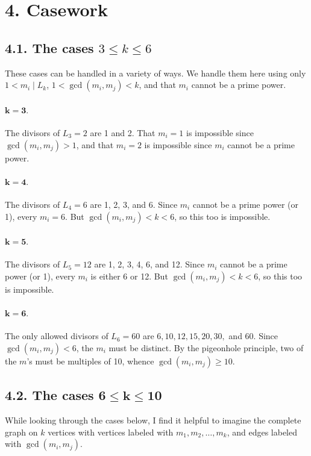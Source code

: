 \documentclass[12pt]{article}
\begin{document}
\vskip 30pt
\section*{\normalsize 4. Casework}

\subsection*{\normalsize 4.1. The cases $3\le k \le 6$}
These cases can be handled in a variety of ways. We handle them here using only \mbox{$1<m_i \mid L_k$},
$1<\gcd(m_i,m_j)<k$, and that $m_i$ cannot be a prime power.

\paragraph{{$\mathbf{k=3}.$}}
The divisors of $L_3=2$ are 1 and 2. That $m_i=1$ is impossible since $\gcd(m_i,m_j)>1$, and that $m_i=2$ is
impossible since $m_i$ cannot be a prime power.

\paragraph{$\mathbf{k=4}.$}
The divisors of $L_4=6$ are 1, 2, 3, and 6. Since $m_i$ cannot be a prime power (or 1), every $m_i=6$. But
$\gcd(m_i,m_j)<k<6$, so this too is impossible.

\paragraph{$\mathbf{k=5}.$}
The divisors of $L_5=12$ are 1, 2, 3, 4, 6, and 12. Since $m_i$ cannot be a prime power (or 1), every $m_i$ is
either $6$ or 12. But $\gcd(m_i,m_j)<k<6$, so this too is impossible.

\paragraph{$\mathbf{k=6}.$}
The only allowed divisors of $L_6=60$ are $6, 10, 12, 15, 20, 30,$ and 60. Since $\gcd(m_i,m_j)<6$, the $m_i$
must be distinct. By the pigeonhole principle, two of the $m$'s must be multiples of 10, whence
$\gcd(m_i,m_j)\ge 10$.


\subsection*{\normalsize 4.2. The cases $\mathbf{6\le k \le 10}$}

While looking through the cases below, I find it helpful to imagine the complete graph on $k$ vertices with
vertices labeled with $m_1,m_2,\dots,m_k$, and edges labeled with $\gcd(m_i,m_j)$.
\end{document}
